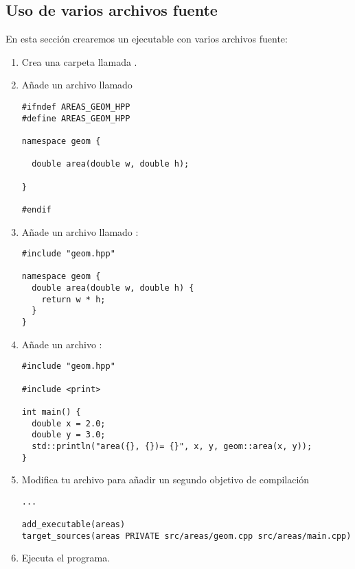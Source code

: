\subsection{Uso de varios archivos fuente}

En esta sección crearemos un ejecutable con varios archivos fuente:

\begin{enumerate}

\item
Crea una carpeta llamada .

\item
Añade un archivo llamado 

\begin{lstlisting}
#ifndef AREAS_GEOM_HPP
#define AREAS_GEOM_HPP

namespace geom {

  double area(double w, double h);

}

#endif
\end{lstlisting}

\item 
Añade un archivo llamado :

\begin{lstlisting}
#include "geom.hpp"

namespace geom {
  double area(double w, double h) {
    return w * h;
  }
}
\end{lstlisting}

\item
Añade un archivo :

\begin{lstlisting}
#include "geom.hpp"

#include <print>

int main() {
  double x = 2.0;
  double y = 3.0;
  std::println("area({}, {})= {}", x, y, geom::area(x, y));
}
\end{lstlisting}

\item
Modifica tu archivo  para añadir un segundo 
objetivo de compilación

\begin{lstlisting}
...

add_executable(areas)
target_sources(areas PRIVATE src/areas/geom.cpp src/areas/main.cpp)
\end{lstlisting}

\item
Ejecuta el programa.

\end{enumerate}
